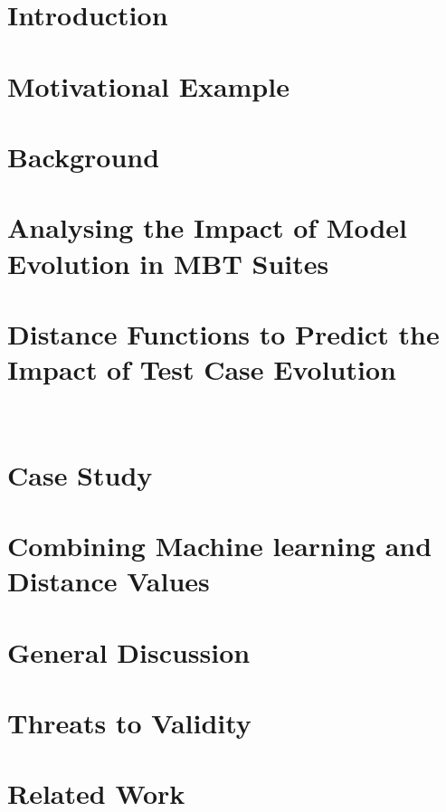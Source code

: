 \documentclass{sbc2019}%
\begin{document}
\section{Introduction}
\label{sec:intro}


\section{Motivational Example} \label{sec:motiv}


\section{Background}
\label{sec:background}


\section{Analysing the Impact of Model Evolution in MBT Suites}\label{sec:emp}


\section{Distance Functions to Predict the Impact of Test Case Evolution}\label{sec:es}

\
\section{Case Study}
\label{sec:case}


\section{Combining Machine learning and Distance Values}
\label{sec:ml}


\section{General Discussion}
\label{sec:gd}


\section{Threats to Validity}
\label{sec:threats}


\section{Related Work}
\label{sec:related}

\end{document}

